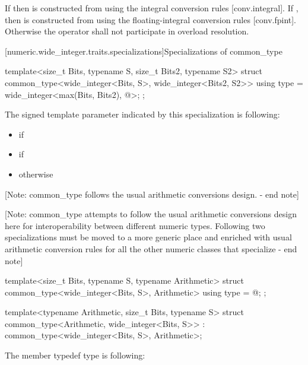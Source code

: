 \begin{addedblock}
\begin{itemdescr}
\returns If  then  is constructed from  using the integral conversion rules [conv.integral]. If , then  is constructed from  using the floating-integral conversion rules [conv.fpint]. Otherwise the operator shall not participate in overload resolution.
\end{itemdescr}

[numeric.wide_integer.traits.specializations]{Specializations of common_type}

\begin{itemdecl}
template<size_t Bits, typename S, size_t Bits2, typename S2>
struct common_type<wide_integer<Bits, S>, wide_integer<Bits2, S2>> {
    using type = wide_integer<max(Bits, Bits2), @\seebelow@>;
};
\end{itemdecl}

The signed template parameter indicated by this specialization is following:

\begin{itemize}
\item {} if 
\item {} if 
\item {} otherwise
\end{itemize}

[Note: common_type follows the usual arithmetic conversions design. - end note]

[Note: common_type attempts to follow the usual arithmetic conversions design here for interoperability between different numeric types. Following two specializations must be moved to a more generic place and enriched with usual arithmetic conversion rules for all the other numeric classes that specialize - end note]

\begin{itemdecl}
template<size_t Bits, typename S, typename Arithmetic>
struct common_type<wide_integer<Bits, S>, Arithmetic> {
    using type = @\seebelow@;
};

template<typename Arithmetic, size_t Bits, typename S>
struct common_type<Arithmetic, wide_integer<Bits, S>>
: common_type<wide_integer<Bits, S>, Arithmetic>;
\end{itemdecl}

The member typedef type is following:


\end{addedblock}
